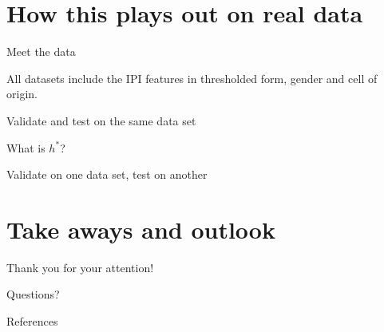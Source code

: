 \documentclass[10pt, aspectratio=169]{beamer}
\begin{document}
\section{How this plays out on real data}

\begin{frame}{Meet the data}
  

  All datasets include the IPI features in thresholded form, gender and cell of 
  origin.
\end{frame}

\begin{frame}{Validate and test on the same data set}
  
\end{frame}

\begin{frame}{What is $h^*$?}
\end{frame}

\begin{frame}{Validate on one data set, test on another}
\end{frame}

\section{Take aways and outlook}

\begin{frame}[standout]
  Thank you for your attention! \par Questions?
\end{frame}

\appendix

\begin{frame}[allowframebreaks]{References}
  
\end{frame}
\end{document}
